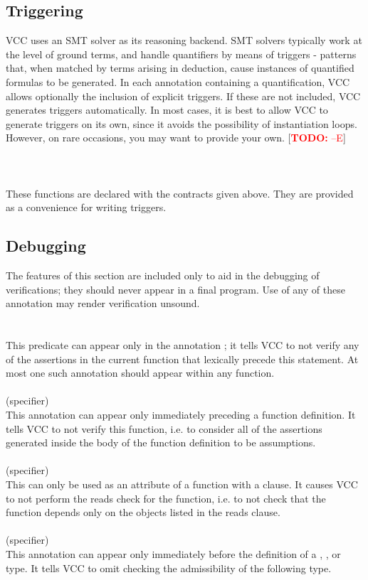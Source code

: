 \documentclass[preprint,nocopyrightspace]{sigplanconf}
\newcommand{\todo}[1]{[\textcolor{red}{\textbf{TODO:} {#1}}]}
\begin{document}
{\subsection{Triggering}
\label{sect::triggers}
VCC uses an SMT solver as its reasoning backend. SMT solvers typically
work at the level of ground terms, and handle quantifiers by means of
triggers - patterns that, when matched by terms arising in deduction,
cause instances of quantified formulas to be generated. In each
annotation containing a quantification, VCC allows optionally the
inclusion of explicit triggers. If these are not included, VCC
generates triggers automatically. In most cases, it is best to allow
VCC to generate triggers on its own, since it avoids the possibility
of instantiation loops. However, on rare occasions, you may want to
provide your own. \todo{--E}
\\\\
\\
\\
These functions are declared with the contracts given above. They are provided as a
convenience for writing triggers. 

\subsection{Debugging}
The features of this section are included only to aid in the debugging
of verifications; they should never appear in a final program. Use of
any of these annotation may render verification unsound.
\\\\
\\
This predicate can appear only in the
annotation ; it tells VCC to not verify
any of the assertions in the current function that lexically precede
this statement. At most one such annotation should appear within any
function. 
\\\\
 (specifier)\\
This annotation can appear only immediately preceding a function
definition. It tells VCC to not verify this function, i.e. to consider
all of the assertions generated inside the body of the function
definition to be assumptions.
\\\\
 (specifier)\\
This  can only be used as an attribute of a  function
with a  clause. It causes VCC to not perform the reads
check for the function, i.e. to not check that the function depends
only on the objects listed in the reads clause.
\\\\
 (specifier)\\
This annotation can appear only immediately before the definition of
a , , or  type. It tells VCC to
omit checking the admissibility of the following type.

}
\end{document}
